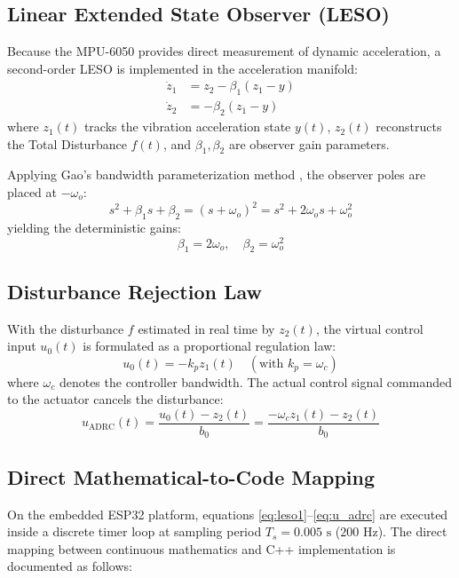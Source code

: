 \documentclass[conference]{IEEEtran}
\begin{document}
\subsection{Linear Extended State Observer (LESO)}
Because the MPU-6050 provides direct measurement of dynamic acceleration, a second-order LESO is implemented in the acceleration manifold:
\begin{align}
\dot{z}_1 &= z_2 - \beta_1(z_1 - y) \label{eq:leso1} \\
\dot{z}_2 &= -\beta_2(z_1 - y) \label{eq:leso2}
\end{align}
where $z_1(t)$ tracks the vibration acceleration state $y(t)$, $z_2(t)$ reconstructs the Total Disturbance $f(t)$, and $\beta_1, \beta_2$ are observer gain parameters.

Applying Gao's bandwidth parameterization method \cite{gao2003scaling}, the observer poles are placed at $-\omega_o$:
\begin{equation}
s^2 + \beta_1 s + \beta_2 = (s + \omega_o)^2 = s^2 + 2\omega_o s + \omega_o^2
\end{equation}
yielding the deterministic gains:
\begin{equation}
\beta_1 = 2\omega_o, \quad \beta_2 = \omega_o^2
\label{eq:observer_gains}
\end{equation}

\subsection{Disturbance Rejection Law}
With the disturbance $f$ estimated in real time by $z_2(t)$, the virtual control input $u_0(t)$ is formulated as a proportional regulation law:
\begin{equation}
u_0(t) = -k_p z_1(t) \quad (\text{with } k_p = \omega_c)
\end{equation}
where $\omega_c$ denotes the controller bandwidth. The actual control signal commanded to the actuator cancels the disturbance:
\begin{equation}
u_{\text{ADRC}}(t) = \frac{u_0(t) - z_2(t)}{b_0} = \frac{-\omega_c z_1(t) - z_2(t)}{b_0}
\label{eq:u_adrc}
\end{equation}

\subsection{Direct Mathematical-to-Code Mapping}
On the embedded ESP32 platform, equations \eqref{eq:leso1}--\eqref{eq:u_adrc} are executed inside a discrete timer loop at sampling period $T_s = 0.005\text{ s}$ ($200\text{ Hz}$). The direct mapping between continuous mathematics and C++ implementation is documented as follows:
\end{document}
